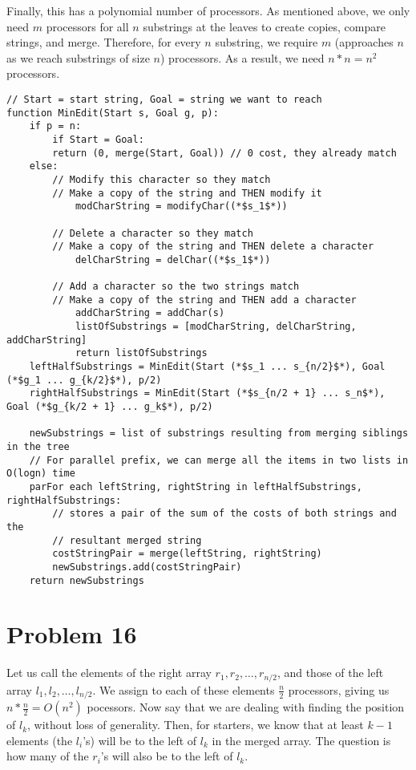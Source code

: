 \documentclass{article}
\providecommand{\prob}[1]{\section*{Problem #1}}
\begin{document}
Finally, this has a polynomial number of processors.  As mentioned above, we only need $m$ processors for all $n$ substrings at the leaves to create copies, compare strings, and merge.  Therefore, for every $n$ substring, we require $m$ (approaches $n$ as we reach substrings of size $n$) processors.  As a result, we need $n*n = n^2$ processors.
\begin{lstlisting}
// Start = start string, Goal = string we want to reach
function MinEdit(Start s, Goal g, p):
    if p = n:
        if Start = Goal:
	    return (0, merge(Start, Goal)) // 0 cost, they already match
	else:
	    // Modify this character so they match
	    // Make a copy of the string and THEN modify it
            modCharString = modifyChar((*$s_1$*))
	
	    // Delete a character so they match
	    // Make a copy of the string and THEN delete a character
            delCharString = delChar((*$s_1$*))
			
	    // Add a character so the two strings match
	    // Make a copy of the string and THEN add a character
            addCharString = addChar(s)
            listOfSubstrings = [modCharString, delCharString, addCharString]
            return listOfSubstrings
    leftHalfSubstrings = MinEdit(Start (*$s_1 ... s_{n/2}$*), Goal (*$g_1 ... g_{k/2}$*), p/2)
    rightHalfSubstrings = MinEdit(Start (*$s_{n/2 + 1} ... s_n$*), Goal (*$g_{k/2 + 1} ... g_k$*), p/2)
	
    newSubstrings = list of substrings resulting from merging siblings in the tree
    // For parallel prefix, we can merge all the items in two lists in O(logn) time
    parFor each leftString, rightString in leftHalfSubstrings, rightHalfSubstrings:
        // stores a pair of the sum of the costs of both strings and the 
        // resultant merged string
        costStringPair = merge(leftString, rightString)
        newSubstrings.add(costStringPair)
    return newSubstrings
\end{lstlisting}
\pagebreak
\prob{16}
Let us call the elements of the right array $r_1, r_2, \dots, r_{n/2}$, and those of the left array $l_1, l_2, \dots, l_{n/2}$.
We assign to each of these elements $\frac{n}{2}$ processors, giving us $n * \frac{n}{2} = O(n^2)$ pocessors.
Now say that we are dealing with finding the position of $l_k$, without loss of generality.
Then, for starters, we know that at least $k-1$ elements (the $l_i$'s) will be to the left of $l_k$ in the merged array.
The question is how many of the $r_i$'s will also be to the left of $l_k$.
\end{document}
